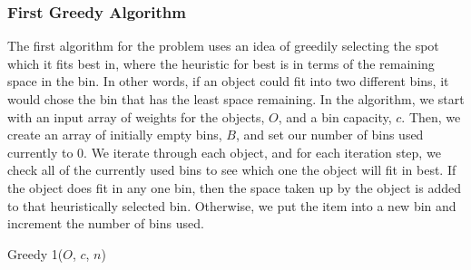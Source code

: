 \documentclass[11pt]{article}
\begin{document}
\subsubsection{First Greedy Algorithm}
The first algorithm for the problem uses an idea of greedily selecting the spot which it fits best
in, where the heuristic for best is in terms of the remaining space in the bin. In other words, if an
object could fit into two different bins, it would chose the bin that has the least space remaining.
In the algorithm, we start with an input array of weights for the objects, ${O}$, and a bin
capacity, ${c}$. Then, we create an array of initially empty bins, ${B}$, and set our number of bins
used currently to 0. We iterate through each object, and for each iteration step, we check all of
the currently used bins to see which one the object will fit in best. If the object does fit in any
one bin, then
the space taken up by the object is added to that heuristically selected bin. Otherwise, we put the
item into a new bin and increment the number of bins used.

\begin{algorithm}[H]
	\SetAlgoLined
	\SetStartEndCondition{ }{}{}%
	\AlgoDontDisplayBlockMarkers\SetAlgoNoEnd\SetAlgoNoLine%
	\caption{Greedy 1(${O}$, ${c}$, ${n}$)\label{greedy1}}
\end{algorithm}
\end{document}
